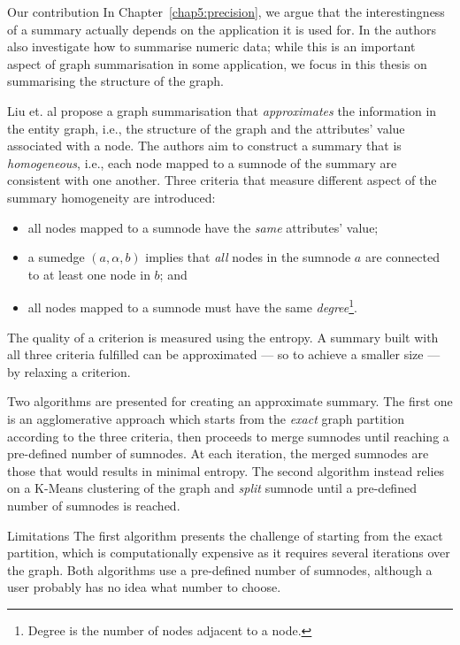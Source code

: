 \begin{centeremph}{Our contribution}
In Chapter~\ref{chap5:precision}, we argue that the interestingness of a summary actually depends on the application it is used for. In \cite{zhang:2010:ddg} the authors also investigate how to summarise numeric data; while this is an important aspect of graph summarisation in some application, we focus in this thesis on summarising the structure of the graph.
\end{centeremph}

Liu et. al \cite{zheng:ipsj:2011} propose a graph summarisation that \emph{approximates} the information in the entity graph, i.e., the structure of the graph and the attributes' value associated with a node. The authors aim to construct a summary that is \emph{homogeneous}, i.e., each node mapped to a sumnode of the summary are consistent with one another. Three criteria that measure different aspect of the summary homogeneity are introduced:
\begin{itemize}
	\item all nodes mapped to a sumnode have the \emph{same} attributes' value;
	\item a sumedge $(a,\alpha,b)$ implies that \emph{all} nodes in the sumnode $a$ are connected to at least one node in $b$; and
	\item all nodes mapped to a sumnode must have the same \emph{degree}\footnote{Degree is the number of nodes adjacent to a node.}.
\end{itemize}
The quality of a criterion is measured using the entropy. A summary built with all three criteria fulfilled can be approximated --- so to achieve a smaller size --- by relaxing a criterion.

Two algorithms are presented for creating an approximate summary. The first one is an agglomerative approach which starts from the \emph{exact} graph partition according to the three criteria, then proceeds to merge sumnodes until reaching a pre-defined number of sumnodes. At each iteration, the merged sumnodes are those that would results in minimal entropy. The second algorithm instead relies on a K-Means clustering of the graph and \emph{split} sumnode until a pre-defined number of sumnodes is reached.

\begin{centeremph}{Limitations}
	The first algorithm presents the challenge of starting from the exact partition, which is computationally expensive as it requires several iterations over the graph. Both algorithms use a pre-defined number of sumnodes, although a user probably has no idea what number to choose.
\end{centeremph}

